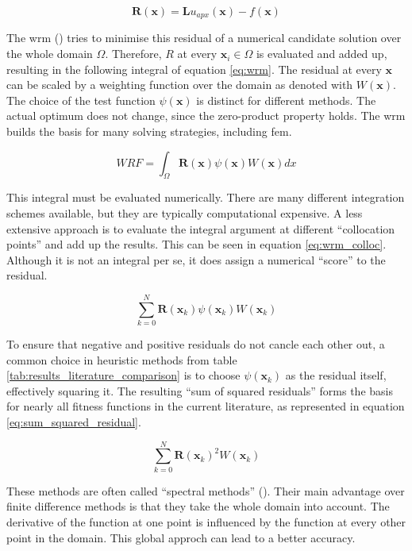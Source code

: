 \documentclass[./\jobname.tex]{subfiles}
\begin{document}
\begin{equation}
\label{eq:residual}
\mathbf{R}(\mathbf{x}) = \mathbf{L}u_{apx}(\mathbf{x}) - f(\mathbf{x})
\end{equation}

The \gls{wrm} (\cite{shen_spectral_2011}) tries to minimise this residual of a numerical candidate solution over the whole domain $\Omega$. Therefore, $R$ at every $\mathbf{x}_i \in \Omega$ is evaluated and added up, resulting in the following integral of equation \ref{eq:wrm}. The residual at every $\mathbf{x}$ can be scaled by a weighting function over the domain as denoted with $W(\mathbf{x})$. The choice of the test function $\psi(\mathbf{x})$ is distinct for different methods. The actual optimum does not change, since the zero-product property holds. The \gls{wrm} builds the basis for many solving strategies, including \gls{fem}. 

\begin{equation}
\label{eq:wrm}
WRF = \int_{\Omega} \mathbf{R}(\mathbf{x}) \psi(\mathbf{x}) W(\mathbf{x}) dx
\end{equation}

This integral must be evaluated numerically. There are many different integration schemes available, but they are typically computational expensive. A less extensive approach is to evaluate the integral argument at different ``collocation points'' and add up the results. This can be seen in equation \ref{eq:wrm_colloc}. Although it is not an integral per se, it does assign a numerical ``score'' to the residual. 

\begin{equation}
\label{eq:wrm_colloc}
\sum_{k=0}^{N} \mathbf{R}(\mathbf{x}_k) \psi(\mathbf{x}_k) W(\mathbf{x}_k)
\end{equation}

To ensure that negative and positive residuals do not cancle each other out, a common choice in heuristic methods from table \ref{tab:results_literature_comparison} is to choose $\psi(\mathbf{x}_k)$ as the residual itself, effectively squaring it. The resulting ``sum of squared residuals'' forms the basis for nearly all fitness functions in the current literature, as represented in equation \ref{eq:sum_squared_residual}.

\begin{equation}
\label{eq:sum_squared_residual}
\sum_{k=0}^{N} \mathbf{R}(\mathbf{x}_k)^2 W(\mathbf{x}_k)
\end{equation}

These methods are often called ``spectral methods'' (\cite{shen_spectral_2011}). Their main advantage over finite difference methods is that they take the whole domain into account. The derivative of the function at one point is influenced by the function at every other point in the domain. This global approch can lead to a better accuracy. 
\end{document}
